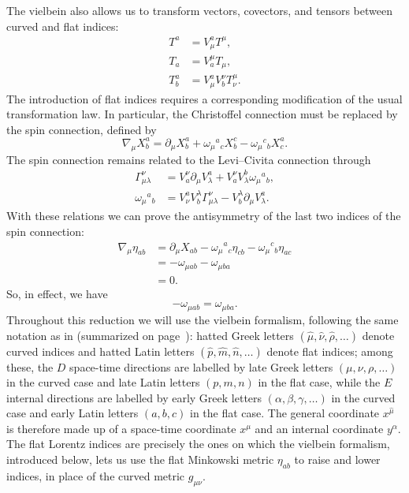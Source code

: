 \documentclass{article}
\begin{document}
The vielbein also allows us to transform vectors, covectors, and tensors between curved and flat indices:
\begin{align} \label{changeofbasis}
    T^a &= V^a_\mu T^\mu, \\
    T_a &= V^\mu_a T_\mu, \\
    T^a_b &= V^a_\mu V^\nu_b T^\mu_\nu.
\end{align}
The introduction of flat indices requires a corresponding modification of the usual transformation law. In particular, the Christoffel connection must be replaced by the spin connection, defined by
\begin{equation} \label{spinconnexion}
    \nabla_\mu X^a_b =
    \partial_\mu X^a_b
    + \omega_\mu{}^a{}_c X^c_b
    - \omega_\mu{}^c{}_b X^a_c.
\end{equation}
The spin connection remains related to the Levi--Civita connection through
\begin{align} \label{linkbetwinleviandlatin}
    \Gamma_{\mu \lambda}^{\nu}
    &= V^{\nu}_a \partial_\mu V^a_\lambda
    + V^\nu_aV^b_\lambda \omega_\mu{}^a{}_b,\\
    \omega_\mu{}^a{}_b
    &= V^a_\nu V^\lambda_b \Gamma_{\mu \lambda}^{\nu}
    - V^\lambda_b \partial_\mu V^a_\lambda.
\end{align}
With these relations we can prove the antisymmetry of the last two indices of the spin connection:
\begin{equation}
    \begin{aligned}
        \nabla_\mu \eta_{ab} &= \partial_\mu X_{ab} - \omega_\mu{}^a{}_c \eta_{cb} - \omega_\mu{}^c{}_b \eta_{ac} \\
        &=  - \omega_{\mu a b } - \omega_{\mu b a}\\
        & = 0.
    \end{aligned}
\end{equation}
So, in effect, we have
\begin{equation} \label{antisymlat}
    - \omega_{\mu a b }= \omega_{\mu b a}.
\end{equation}
Throughout this reduction we will use the vielbein formalism, following the same notation as in \cite{scherk1979get} (summarized on page~\pageref{notation}): 
hatted Greek letters $(\hat \mu , \hat \nu , \hat \rho , \dots)$ denote curved indices and hatted Latin letters $(\hat p , \hat m , \hat n , \dots)$ denote flat indices; among these, 
the $D$ space-time directions are labelled by late Greek letters $(\mu, \nu, \rho, \dots)$ in the curved case and late Latin letters $(p, m, n)$ in the flat case, 
while the $E$ internal directions are labelled by early Greek letters $(\alpha, \beta, \gamma, \dots)$ in the curved case and early Latin letters $(a, b, c)$ in the flat case. 
The general coordinate $x^{\hat \mu}$ is therefore made up of a space-time coordinate $x^\mu$ and an internal coordinate $y^\alpha$. 
The flat Lorentz indices are precisely the ones on which the vielbein formalism, 
introduced below, lets us use the flat Minkowski metric $\eta_{ab}$ to raise and lower indices, in place of the curved metric $g_{\mu \nu}$.
\end{document}
